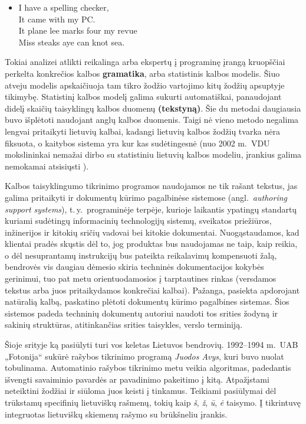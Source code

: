 \begin{multicols}{2}
\begin{itemize}
\item[] I have a spelling checker,\\
  It came with my PC.\\
  It plane lee marks four my revue\\
  Miss steaks aye can knot sea.
\end{itemize}

Tokiai analizei atlikti reikalinga arba ekspertų į programinę įrangą kruopščiai perkelta konkrečios kalbos \textbf{gramatika}, arba statistinis kalbos modelis. Šiuo atveju modelis apskaičiuoja tam tikro žodžio vartojimo kitų žodžių apsuptyje tikimybę. Statistinį kalbos modelį galima sukurti automatiškai, panaudojant didelį skaičių taisyklingų kalbos duomenų \textbf{(tekstyną)}. Šie du metodai daugiausia buvo išplėtoti naudojant anglų kalbos duomenis. Taigi nė vieno metodo negalima lengvai pritaikyti lietuvių kalbai, kadangi lietuvių kalbos žodžių tvarka nėra fiksuota, o kaitybos sistema yra kur kas sudėtingesnė (nuo 2002 m.~VDU mokslininkai nemažai dirbo su statistiniu lietuvių kalbos modeliu, įrankius galima nemokamai atsisiųsti \cite{airenas}).   


Kalbos taisyklingumo tikrinimo programos naudojamos ne tik rašant tekstus, jas galima pritaikyti ir dokumentų kūrimo pagalbinėse sistemose (angl.~\textit{authoring support systems}), t.\,y.~programinėje terpėje, kurioje laikantis ypatingų standartų kuriami sudėtingų informacinių technologijų sistemų, sveikatos priežiūros, inžinerijos ir kitokių sričių vadovai bei kitokie dokumentai. Nuogąstaudamos, kad klientai pradės skųstis dėl to, jog produktas bus naudojamas ne taip, kaip reikia, o dėl nesuprantamų instrukcijų bus pateikta reikalavimų kompensuoti žalą, bendrovės vis daugiau dėmesio skiria techninės dokumentacijos kokybės gerinimui, tuo pat metu orientuodamosios į tarptautines rinkas (versdamos tekstus arba juos pritaikydamos konkrečiai kalbai). Pažanga, pasiekta apdorojant natūralią kalbą, paskatino plėtoti dokumentų kūrimo pagalbines sistemas. Šios sistemos padeda techninių dokumentų autoriui naudoti tos srities žodyną ir sakinių struktūras, atitinkančias srities taisykles, verslo terminiją.

Šioje srityje ką pasiūlyti turi vos keletas Lietuvos bendrovių. 1992–1994 m.~UAB „Fotonija“ sukūrė rašybos tikrinimo programą \textit{Juodos Avys}, kuri buvo nuolat tobulinama. Automatinio rašybos tikrinimo metu veikia algoritmas, padedantis išvengti savaiminio pavardės ar pavadinimo pakeitimo į kitą. Atpažįstami neteiktini žodžiai ir siūloma juos keisti į tinkamus. Teikiami pasiūlymai dėl trūkstamų specifinių lietuviškų rašmenų, tokių kaip \textit{š}, \textit{ž},  \textit{ū}, \textit{ė} taisymo. Į tikrintuvę integruotas lietuviškų skiemenų rašymo su brūkšneliu įrankis.   


\end{multicols}

